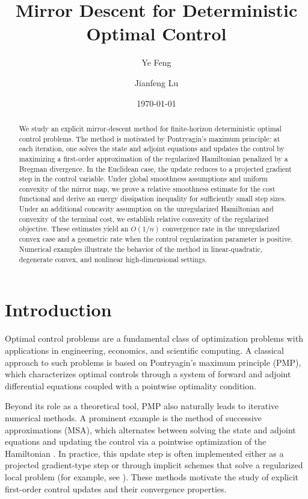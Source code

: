 \documentclass[11pt]{amsart}
\title{Mirror Descent for Deterministic Optimal Control}
\date{\today} %
\author{Ye Feng}
\author{Jianfeng Lu}
\theoremstyle{plain}
\theoremstyle{definition}
\theoremstyle{remark}
\begin{document}
\begin{abstract}
We study an explicit mirror-descent method for finite-horizon deterministic optimal control problems. The method is motivated by Pontryagin's maximum principle: at each iteration, one solves the state and adjoint equations and updates the control by maximizing a first-order approximation of the regularized Hamiltonian penalized by a Bregman divergence. In the Euclidean case, the update reduces to a projected gradient step in the control variable. Under global smoothness assumptions and uniform convexity of the mirror map, we prove a relative smoothness estimate for the cost functional and derive an energy dissipation inequality for sufficiently small step sizes. Under an additional concavity assumption on the unregularized Hamiltonian and convexity of the terminal cost, we establish relative convexity of the regularized objective. These estimates yield an \(O(1/n)\) convergence rate in the unregularized convex case and a geometric rate when the control regularization parameter is positive. Numerical examples illustrate the behavior of the method in linear-quadratic, degenerate convex, and nonlinear high-dimensional settings.
\end{abstract}

\maketitle

\section{Introduction}

Optimal control problems are a fundamental class of optimization problems with applications in engineering, economics, and scientific computing. A classical approach to such problems is based on Pontryagin’s maximum principle (PMP), which characterizes optimal controls through a system of forward and adjoint differential equations coupled with a pointwise optimality condition.

Beyond its role as a theoretical tool, PMP also naturally leads to iterative numerical methods. A prominent example is the method of successive approximations (MSA), which alternates between solving the state and adjoint equations and updating the control via a pointwise optimization of the Hamiltonian \cite{krylov1972algorithm,chernousko1982method}. In practice, this update step is often implemented either as a projected gradient-type step or through implicit schemes that solve a regularized local problem (for example, see \cite{sethi2024modified}). These methods motivate the study of explicit first-order control updates and their convergence properties.
\end{document}
